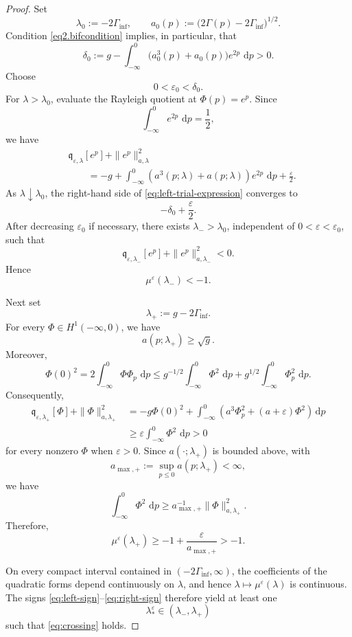 \documentclass[10pt,a4paper]{amsart}
\newcommand{\dd}{\,\mathrm{d}}
\begin{document}
\begin{proof}
Set
\[
\lambda_0:=-2\Gamma_{\inf},
\qquad
a_0(p):=
\bigl(2\Gamma(p)-2\Gamma_{\inf}\bigr)^{1/2}.
\]
Condition \eqref{eq2.bifcondition} implies, in particular, that
\[
\delta_0
:=
g-
\int_{-\infty}^{0}
\bigl(a_0^3(p)+a_0(p)\bigr)e^{2p}\,\dd p
>0.
\]
Choose
\[
0<\varepsilon_0<\delta_0.
\]
For $\lambda>\lambda_0$, evaluate the Rayleigh quotient at
$\Phi(p)=e^p$.  Since
\[
\int_{-\infty}^{0}e^{2p}\,\dd p=\frac12,
\]
we have
\begin{align}
&\mathfrak q_{\varepsilon,\lambda}[e^p]
+\|e^p\|_{a,\lambda}^2
\nonumber\\
&\qquad=
-g+
\int_{-\infty}^{0}
\left(
a^3(p;\lambda)+a(p;\lambda)
\right)e^{2p}\,\dd p
+\frac{\varepsilon}{2}.
\label{eq:left-trial-expression}
\end{align}
As $\lambda\downarrow\lambda_0$, the right-hand side of
\eqref{eq:left-trial-expression} converges to
\[
-\delta_0+\frac{\varepsilon}{2}.
\]
After decreasing $\varepsilon_0$ if necessary, there exists
$\lambda_->\lambda_0$, independent of
$0<\varepsilon<\varepsilon_0$, such that
\[
\mathfrak q_{\varepsilon,\lambda_-}[e^p]
+\|e^p\|_{a,\lambda_-}^2<0.
\]
Hence
\begin{equation}
\label{eq:left-sign}
\mu^\varepsilon(\lambda_-)<-1.
\end{equation}

Next set
\[
\lambda_+:=g-2\Gamma_{\inf}.
\]
For every $\Phi\in H^1(-\infty,0)$, we have
\[
a(p;\lambda_+)\geq\sqrt g.
\]
Moreover,
\[
\Phi(0)^2
=
2\int_{-\infty}^{0}\Phi\Phi_p\,\dd p
\leq
g^{-1/2}\int_{-\infty}^{0}\Phi^2\,\dd p
+
g^{1/2}\int_{-\infty}^{0}\Phi_p^2\,\dd p.
\]
Consequently,
\begin{align*}
\mathfrak q_{\varepsilon,\lambda_+}[\Phi]
+\|\Phi\|_{a,\lambda_+}^2
&=
-g\Phi(0)^2
+
\int_{-\infty}^{0}
\left(
a^3\Phi_p^2+(a+\varepsilon)\Phi^2
\right)\dd p\\
&\geq
\varepsilon\int_{-\infty}^{0}\Phi^2\,\dd p>0
\end{align*}
for every nonzero $\Phi$ when $\varepsilon>0$.  Since
$a(\cdot;\lambda_+)$ is bounded above, with
\[
 a_{\max,+}:=\sup_{p\leq0}a(p;\lambda_+)<\infty,
\]
we have
\[
 \int_{-\infty}^0\Phi^2\,\dd p
 \geq a_{\max,+}^{-1}\|\Phi\|_{a,\lambda_+}^2.
\]
Therefore,
\begin{equation}
\label{eq:right-sign}
\mu^\varepsilon(\lambda_+)
\geq-1+\frac{\varepsilon}{a_{\max,+}}>-1.
\end{equation}

On every compact interval contained in
$(-2\Gamma_{\inf},\infty)$, the coefficients of the quadratic forms
depend continuously on $\lambda$, and hence
$\lambda\mapsto\mu^\varepsilon(\lambda)$ is continuous.  The signs
\eqref{eq:left-sign}--\eqref{eq:right-sign} therefore yield at least
one
\[
\lambda_*^\varepsilon\in(\lambda_-,\lambda_+)
\]
such that \eqref{eq:crossing} holds.


\end{proof}
\end{document}
